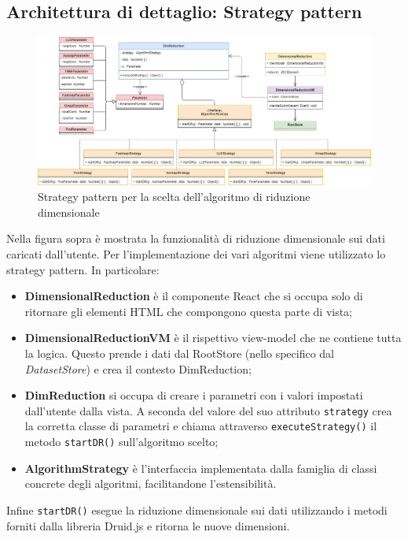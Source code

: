 \subsection{Architettura di dettaglio: Strategy pattern} 
\begin{figure}[hb]
	\includegraphics[width=17cm]{Images/StrategyPattern}
	\centering
	\caption{Strategy pattern per la scelta dell'algoritmo di riduzione dimensionale}
\end{figure}
Nella figura sopra è mostrata la funzionalità di riduzione dimensionale sui dati caricati dall'utente.
Per l'implementazione dei vari algoritmi viene utilizzato lo strategy pattern. In particolare:
\begin{itemize}
	\item \textbf{DimensionalReduction} è il componente React che si occupa solo di ritornare gli elementi HTML che compongono questa parte di vista;
	\item \textbf{DimensionalReductionVM} è il rispettivo view-model che ne contiene tutta la logica. Questo prende i dati dal RootStore (nello specifico dal \textit{DatasetStore}) e crea il contesto DimReduction;
	\item \textbf{DimReduction} si occupa di creare i parametri con i valori impostati dall'utente dalla vista. A seconda del valore del suo attributo \texttt{strategy} crea la corretta classe di parametri e chiama attraverso \texttt{executeStrategy()} il metodo \texttt{startDR()} sull'algoritmo scelto;
	\item \textbf{AlgorithmStrategy} è l'interfaccia implementata dalla famiglia di classi concrete degli algoritmi, facilitandone l'estensibilità.
\end{itemize} 

Infine \texttt{startDR()} esegue la riduzione dimensionale sui dati utilizzando i metodi forniti dalla libreria Druid.js e ritorna le nuove dimensioni.
